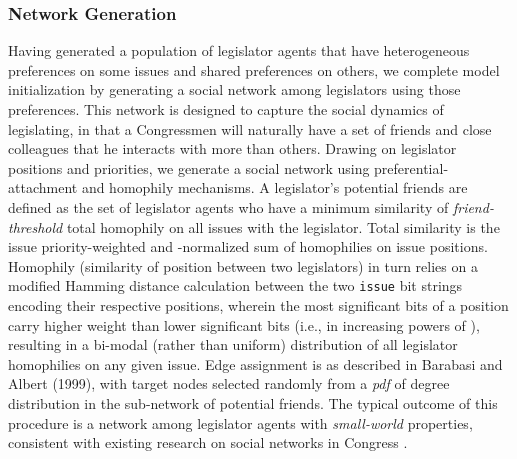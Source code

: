 \documentclass[pdftex,12pt]{llncs}
\begin{document}
\subsubsection{Network Generation}
Having generated a population of legislator agents that have heterogeneous preferences on some issues and shared preferences on others, we complete model initialization by generating a social network among legislators using those preferences.
This network is designed to capture the social dynamics of legislating, in that a Congressmen will naturally have a set of friends and close colleagues that he interacts with more than others.
Drawing on legislator positions and priorities, we generate a social network using preferential-attachment and homophily mechanisms.
A legislator's potential friends are defined as the set of legislator agents who have a minimum similarity of \textit{friend-threshold} total homophily on all issues with the legislator. Total similarity is the issue priority-weighted and -normalized sum of homophilies on issue positions. Homophily (similarity of position between two legislators) in turn relies on a modified Hamming distance calculation between the two \texttt{issue} bit strings encoding their respective positions, wherein the most significant bits of a position carry higher weight than lower significant bits (i.e., in increasing powers of ), resulting in a bi-modal (rather than uniform) distribution of all legislator homophilies on any given issue.
Edge assignment is as described in Barabasi and Albert (1999), with target nodes selected randomly from a \textit{pdf} of degree distribution in the sub-network of potential friends.
The typical outcome of this procedure is a network among legislator agents with \textit{small-world} properties, consistent with existing research on social networks in Congress \parencite{Granovetter1978}.
\end{document}
